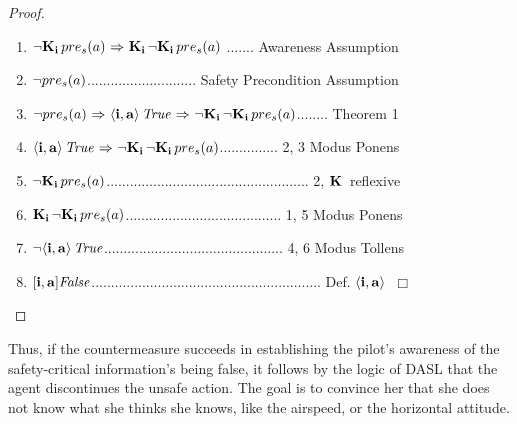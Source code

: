 \begin{proof}\mbox{}
	\begin{enumerate}
		\item ${\neg} \mathbf{K}_{\mathbf{i}}\, pre_s(a) {\ \Rightarrow \ } \mathbf{K}_{\mathbf{i}}\,{\neg} \mathbf{K}_{\mathbf{i}}\,pre_s(a)$ ....... Awareness Assumption
		\item ${\neg} pre_s(a)$............................ Safety Precondition Assumption
		\item ${\neg} pre_s(a) {\ \Rightarrow \ } \mathbf{\langle i, a \rangle}\,\mathit{True} {\ \Rightarrow \ } {\neg} \mathbf{K}_{\mathbf{i}}\,{\neg} \mathbf{K}_{\mathbf{i}}\,pre_s(a)$........ Theorem 1
		\item $\mathbf{\langle i, a \rangle}\,\mathit{True} {\ \Rightarrow \ } {\neg} \mathbf{K}_{\mathbf{i}}\,{\neg} \mathbf{K}_{\mathbf{i}}\,pre_s(a)$............... 2, 3 Modus Ponens
		\item ${\neg} \mathbf{K}_{\mathbf{i}}\,pre_s(a)$.................................................... 2, $\mathbf{K}\,$ reflexive
		\item $\mathbf{K}_{\mathbf{i}}\,{\neg}\mathbf{K}_{\mathbf{i}}\,pre_s(a)$........................................ 1, 5 Modus Ponens
		\item ${\neg} \mathbf{\langle i, a \rangle}\,\mathit{True}$.............................................. 4, 6 Modus Tollens
		\item $\mathbf{[{i, a}]}\mathit{False}$........................................................... Def. $\mathbf{\langle i, a \rangle}\,$  $\Box$
	\end{enumerate}
\end{proof}

Thus, if the countermeasure succeeds in establishing the pilot's awareness of the safety-critical information's being false, it follows by the logic of DASL that the agent discontinues the unsafe action. The goal is to convince her that she does not know what she thinks she knows, like the airspeed, or the horizontal attitude.

